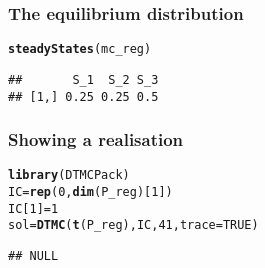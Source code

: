 \documentclass[aspectratio=169]{beamer}\usepackage[]{graphicx}\usepackage[]{xcolor}
\makeatletter
\newcommand{\hlnum}[1]{\textcolor[rgb]{0.686,0.059,0.569}{#1}}%
\newcommand{\hldef}[1]{\textcolor[rgb]{0.345,0.345,0.345}{#1}}%
\newcommand{\hlkwb}[1]{\textcolor[rgb]{0.69,0.353,0.396}{#1}}%
\newcommand{\hlkwc}[1]{\textcolor[rgb]{0.333,0.667,0.333}{#1}}%
\newcommand{\hlkwd}[1]{\textcolor[rgb]{0.737,0.353,0.396}{\textbf{#1}}}%
\newenvironment{kframe}{%
 \def\at@end@of@kframe{}%
 \ifinner\ifhmode%
  \def\at@end@of@kframe{\end{minipage}}%
  \begin{minipage}{\columnwidth}%
 \fi\fi%
 \def\FrameCommand##1{\hskip\@totalleftmargin \hskip-\fboxsep
 \colorbox{shadecolor}{##1}\hskip-\fboxsep
     \hskip-\linewidth \hskip-\@totalleftmargin \hskip\columnwidth}%
 \MakeFramed {\advance\hsize-\width
   \@totalleftmargin\z@ \linewidth\hsize
   \@setminipage}}%
 {\par\unskip\endMakeFramed%
 \at@end@of@kframe}
\newenvironment{knitrout}{}{} %
\makeatother
\begin{document}
\begin{frame}[fragile]
\frametitle{The equilibrium distribution}
\begin{knitrout}
\color{fgcolor}\begin{kframe}
\begin{alltt}
\hlkwd{steadyStates}\hldef{(mc_reg)}
\end{alltt}
\begin{verbatim}
##       S_1  S_2 S_3
## [1,] 0.25 0.25 0.5
\end{verbatim}
\end{kframe}
\end{knitrout}
\end{frame}
  
\begin{frame}[fragile]
\frametitle{Showing a realisation}
\begin{knitrout}
\color{fgcolor}\begin{kframe}
\begin{alltt}
\hlkwd{library}\hldef{(DTMCPack)}
\hldef{IC} \hlkwb{=} \hlkwd{rep}\hldef{(}\hlnum{0}\hldef{,} \hlkwd{dim}\hldef{(P_reg)[}\hlnum{1}\hldef{])}
\hldef{IC[}\hlnum{1}\hldef{]} \hlkwb{=} \hlnum{1}
\hldef{sol} \hlkwb{=} \hlkwd{DTMC}\hldef{(}\hlkwd{t}\hldef{(P_reg), IC,} \hlnum{41}\hldef{,} \hlkwc{trace}\hldef{=}\hlnum{TRUE}\hldef{)}
\end{alltt}
\begin{verbatim}
## NULL
\end{verbatim}
\end{kframe}
\end{knitrout}
\end{frame}

  
\end{document}
